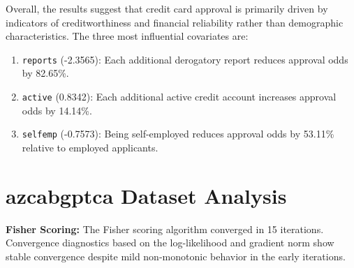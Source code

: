 \documentclass[11pt]{article}
\newcommand{\derivstep}[1]{%
  \par\medskip\noindent #1%
}
\begin{document}
\derivstep{Overall, the results suggest that credit card approval is primarily driven by indicators of creditworthiness and financial reliability rather than demographic characteristics. The three most influential covariates are:}
\begin{enumerate}[itemsep=1pt, topsep=4pt]
\item \texttt{reports} (-2.3565): Each additional derogatory report reduces approval odds by 82.65\%.
\item \texttt{active} (0.8342): Each additional active credit account increases approval odds by 14.14\%.
\item \texttt{selfemp} (-0.7573): Being self-employed reduces approval odds by 53.11\% relative to employed applicants.
\end{enumerate}

\section{azcabgptca Dataset Analysis}
\derivstep{\textbf{Fisher Scoring:}} The Fisher scoring algorithm converged in 15 iterations. Convergence diagnostics based on the log-likelihood and gradient norm show stable convergence despite mild non-monotonic behavior in the early iterations.
\end{document}
